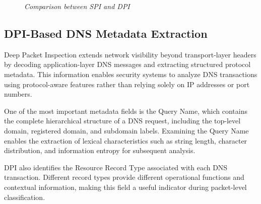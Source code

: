 \documentclass[14pt, a4paper, oneside]{report}
\begin{document}
\begin{figure}[H]
\caption{\textit{Comparison between SPI and DPI}}
\label{fig:spi_vs_dpi_visibility}
\end{figure}

\subsection{DPI-Based DNS Metadata Extraction}
Deep Packet Inspection extends network visibility beyond transport-layer headers by decoding application-layer DNS messages and extracting structured protocol metadata. This information enables security systems to analyze DNS transactions using protocol-aware features rather than relying solely on IP addresses or port numbers.

One of the most important metadata fields is the Query Name, which contains the complete hierarchical structure of a DNS request, including the top-level domain, registered domain, and subdomain labels. Examining the Query Name enables the extraction of lexical characteristics such as string length, character distribution, and information entropy for subsequent analysis.

DPI also identifies the Resource Record Type associated with each DNS transaction. Different record types provide different operational functions and contextual information, making this field a useful indicator during packet-level classification.
\end{document}
